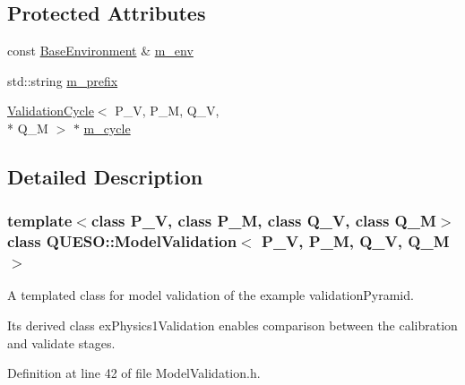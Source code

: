 \subsection*{Protected Attributes}
\begin{DoxyCompactItemize}
\item 
const \hyperlink{class_q_u_e_s_o_1_1_base_environment}{Base\-Environment} \& \hyperlink{class_q_u_e_s_o_1_1_model_validation_a357832c31f58c1bd11c10733317437ae}{m\-\_\-env}
\item 
std\-::string \hyperlink{class_q_u_e_s_o_1_1_model_validation_aa239eb12478d1904e18ffe2ed712630f}{m\-\_\-prefix}
\item 
\hyperlink{class_q_u_e_s_o_1_1_validation_cycle}{Validation\-Cycle}$<$ P\-\_\-\-V, P\-\_\-\-M, Q\-\_\-\-V, \\*
Q\-\_\-\-M $>$ $\ast$ \hyperlink{class_q_u_e_s_o_1_1_model_validation_ac452e290711cc27c9f6cfd2a8242454f}{m\-\_\-cycle}
\end{DoxyCompactItemize}


\subsection{Detailed Description}
\subsubsection*{template$<$class P\-\_\-\-V, class P\-\_\-\-M, class Q\-\_\-\-V, class Q\-\_\-\-M$>$class Q\-U\-E\-S\-O\-::\-Model\-Validation$<$ P\-\_\-\-V, P\-\_\-\-M, Q\-\_\-\-V, Q\-\_\-\-M $>$}

A templated class for model validation of the example validation\-Pyramid. 

Its derived class ex\-Physics1\-Validation enables comparison between the calibration and validate stages. 

Definition at line 42 of file Model\-Validation.\-h.



